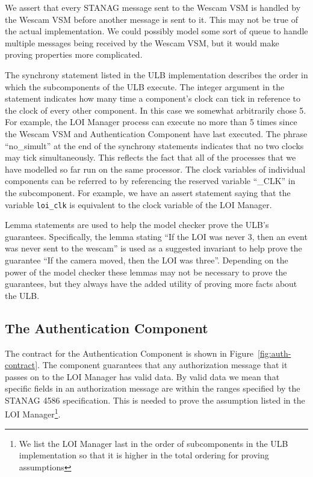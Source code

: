 \documentclass{llncs}
\begin{document}
We assert that every STANAG message sent to the Wescam VSM is handled by the Wescam VSM before another message is sent to it.  This may not be true of the actual implementation.  We could possibly model some sort of queue to handle multiple messages being received by the Wescam VSM, but it would make proving properties more complicated.

The synchrony statement listed in the ULB implementation describes the order in which the subcomponents of the ULB execute. The integer argument in the statement indicates how many time a component's clock can tick in reference to the clock of every other component.  In this case we somewhat arbitrarily chose 5.  For example, the LOI Manager process can execute no more than 5 times since the Wescam VSM and Authentication Component have last executed.  The phrase ``no\_simult'' at the end of the synchrony statements indicates that no two clocks may tick simultaneously.  This reflects the fact that all of the processes that we have modelled so far run on the same processor.  The clock variables of individual components can be referred to by referencing the reserved variable ``\_CLK'' in the subcomponent.  For example, we have an assert statement saying that the variable \texttt{loi\_clk} is equivalent to the clock variable of the LOI Manager.

Lemma statements are used to help the model checker prove the ULB's guarantees.  Specifically, the lemma stating ``If the LOI was never 3, then an event was never sent to the wescam'' is used as a suggested invariant to help prove the guarantee ``If the camera moved, then the LOI was three''.  Depending on the power of the model checker these lemmas may not be necessary to prove the guarantees, but they always have the added utility of proving more facts about the ULB.

\subsection{The Authentication Component}

The contract for the Authentication Component is shown in Figure~\ref{fig:auth-contract}.  The component guarantees that any authorization message that it passes on to the LOI Manager has valid data. By valid data we mean that specific fields in an authorization message are within the ranges specified by the STANAG 4586 specification. This is needed to prove the assumption listed in the LOI Manager\footnote{We list the LOI Manager last in the order of subcomponents in the ULB implementation so that it is higher in the total ordering for proving assumptions}.
\end{document}
